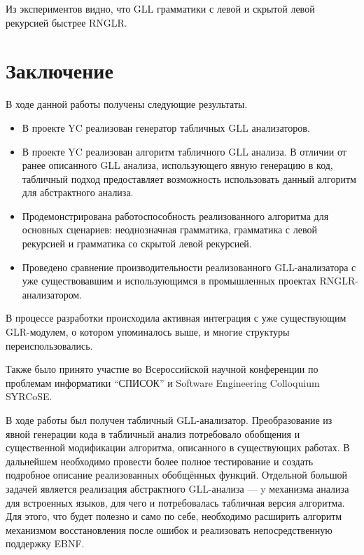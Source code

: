 Из экспериментов видно, что GLL грамматики с левой и скрытой левой рекурсией быстрее RNGLR.

\section*{Заключение}
В ходе данной работы получены следующие результаты.
\begin{itemize}
\item В проекте YC реализован генератор табличных GLL анализаторов.
\item В проекте YC реализован алгоритм табличного GLL анализа. В отличии от ранее описанного GLL анализа, использующего явную генерацию в код, табличный подход предоставляет возможность использовать данный алгоритм для абстрактного анализа.
\item Продемонстрирована работоспособность реализованного алгоритма для основных сценариев: неоднозначная грамматика, грамматика с левой рекурсией и грамматика со скрытой левой рекурсией.
\item Проведено сравнение производительности реализованного GLL-анализатора с уже существовавшим и использующимся в промышленных проектах RNGLR-анализатором.
\end{itemize}

В процессе разработки происходила активная интеграция с уже существующим GLR-модулем, о котором упоминалось выше, и многие структуры переиспользовались.

Также было принято участие во Всероссийской научной конференции по проблемам информатики “СПИСОК” и Software Engineering Colloquium SYRCoSE. 

В ходе работы был получен табличный GLL-анализатор. Преобразование из явной генерации кода в табличный анализ потребовало обобщения  и существенной модификации алгоритма, описанного в существующих работах. В дальнейшем необходимо провести более полное тестирование и создать подробное описание реализованных обобщённых функций. 
Отдельной большой задачей является реализация абстрактного GLL-анализа --- y механизма анализа для встроенных языков, для чего и потребовалась табличная версия алгоритма. Для этого, что будет полезно и само по себе, необходимо расширить алгоритм механизмом восстановления после ошибок и реализовать непосредственную поддержку EBNF.
 

